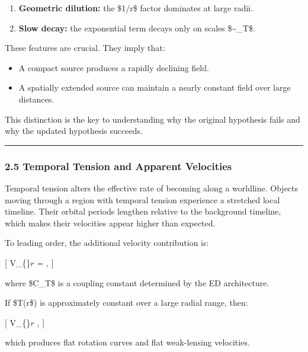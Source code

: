 \begin{enumerate}
\def\labelenumi{\arabic{enumi}.}
\tightlist
\item
  \textbf{Geometric dilution:} the \$1/r\$ factor dominates at large
  radii.\\
\item
  \textbf{Slow decay:} the exponential term decays only on scales
  \$\sim \ell\_T\$.
\end{enumerate}

These features are crucial. They imply that:

\begin{itemize}
\tightlist
\item
  A compact source produces a rapidly declining field.\\
\item
  A spatially extended source can maintain a nearly constant field over
  large distances.
\end{itemize}

This distinction is the key to understanding why the original hypothesis
fails and why the updated hypothesis succeeds.

\begin{center}\rule{0.5\linewidth}{0.5pt}\end{center}

\subsubsection{2.5 Temporal Tension and Apparent
Velocities}\label{temporal-tension-and-apparent-velocities}

Temporal tension alters the effective rate of becoming along a
worldline. Objects moving through a region with temporal tension
experience a stretched local timeline. Their orbital periods lengthen
relative to the background timeline, which makes their velocities appear
higher than expected.

To leading order, the additional velocity contribution is:

{[} V\_\{\}\(r\) = ,  {]}

where \$C\_T\$ is a coupling constant determined by the ED architecture.

If \$T(r\$) is approximately constant over a large radial range, then:

{[} V\_\{\}\(r\) \approx {},  {]}

which produces flat rotation curves and flat weak-lensing velocities.

